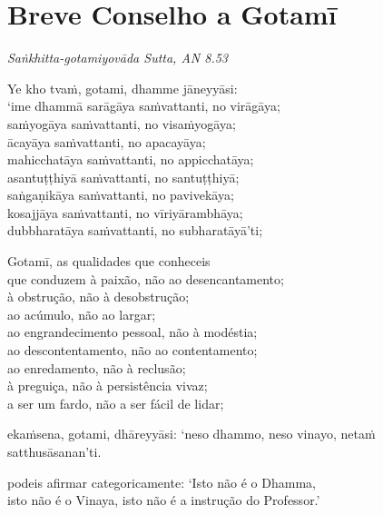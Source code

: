 \chapter[Breve Conselho a Gotamī]{Breve Conselho a Gotamī}

\emph{Saṅkhitta-gotamiyovāda Sutta, AN 8.53}


\begin{leader}
\end{leader}

Ye kho tvaṁ, gotami, dhamme jāneyyāsi:\\
‘ime dhammā sarāgāya saṁvattanti, no virāgāya;\\
saṁyogāya saṁvattanti, no visaṁyogāya;\\
ācayāya saṁvattanti, no apacayāya;\\
mahicchatāya saṁvattanti, no appicchatāya;\\
asantuṭṭhiyā saṁvattanti, no santuṭṭhiyā;\\
saṅgaṇikāya saṁvattanti, no pavivekāya;\\
kosajjāya saṁvattanti, no vīriyārambhāya;\\
dubbharatāya saṁvattanti, no subharatāyā’ti;

\begin{english}
  Gotamī, as qualidades que conheceis\\
  que conduzem à paixão, não ao desencantamento;\\
  à obstrução, não à desobstrução;\\
  ao acúmulo, não ao largar;\\
  ao engrandecimento pessoal, não à modéstia;\\
  ao descontentamento, não ao contentamento;\\
  ao enredamento, não à reclusão;\\
  à preguiça, não à persistência vivaz;\\
  a ser um fardo, não a ser fácil de lidar;
\end{english}

ekaṁsena, gotami, dhāreyyāsi: ‘neso dhammo, neso vinayo, netaṁ satthusāsanan’ti.

\begin{english}
  podeis afirmar categoricamente: ‘Isto não é o Dhamma,\\
  isto não é o Vinaya, isto não é a instrução do Professor.’
\end{english}

